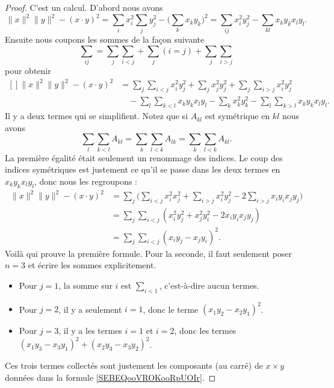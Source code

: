 \begin{proof}
    C'est un calcul. D'abord nous avons
    \begin{equation}
        \| x \|^2\| y \|^2-(x\cdot y)^2=\sum_ix_i^2\sum_jy_j^2-\big( \sum_k x_ky_k  \big)^2=\sum_{ij}x_i^2y_j^2-\sum_{kl}x_ky_kx_ly_l.
    \end{equation}
    Ensuite nous coupons les sommes de la façon suivante
    \begin{equation}
        \sum_{ij}=\sum_j\sum_{i<j}+\sum_j(i=j)+\sum_j\sum_{i>j}
    \end{equation}
    pour obtenir
    \begin{equation}
        \begin{aligned}[]
            \| x \|^2\| y \|^2-(x\cdot y)^2&=\sum_j\sum_{i<j}x_i^2y_j^2+\sum_jx_j^2y_j^2+\sum_j\sum_{i>j}x_i^2y_j^2\\
                &\quad-\sum_l\sum_{k<l}x_ky_kx_ly_l-\sum_kx_k^2y_k^2-\sum_l\sum_{k>l}x_ky_kx_ly_l.
        \end{aligned}
    \end{equation}
    Il y a deux termes qui se simplifient. Notez que si \( A_{kl}\) est symétrique en \( kl\) nous avons
    \begin{equation}
        \sum_l\sum_{k<l}A_{kl}=\sum_k\sum_{l<k}A_{lk}=\sum_k\sum_{l<k}A_{kl}.
    \end{equation}
    La première égalité était seulement un renommage des indices. Le coup des indices symétriques est justement ce qu'il se passe dans les deux termes en\( x_ky_kx_ly_l\), donc nous les regroupons :
    \begin{subequations}
        \begin{align}
            \| x \|^2\| y \|^2-(x\cdot y)^2&=\sum_j\big( \sum_{i<j}x_i^2x_j^2+\sum_{i>j}x_i^2y_j^2-2\sum_{i>j}x_iy_ix_jy_j \big)\\
            &=\sum_j\sum_{i<j}(x_i^2y_j^2+x_j^2y_i^2-2x_iy_ix_jy_j)\\
            &=\sum_j\sum_{i<j}(x_iy_j-x_jy_i)^2.
        \end{align}
    \end{subequations}
    Voilà qui prouve la première formule. Pour la seconde, il faut seulement poser \( n=3\) et écrire les sommes explicitement.

    \begin{itemize}
        \item
            Pour \( j=1\), la somme sur \( i\) est \( \sum_{i<1}\), c'est-à-dire aucun termes.
        \item
            Pour \( j=2\), il y a seulement \( i=1\), donc le terme \( (x_1y_2-x_2y_1)^2\).
        \item
            Pour \( j=3\), il y a les termes \( i=1\) et \( i=2\), donc les termes \( (x_1y_3-x_3y_1)^2+(x_2y_3-x_3y_2)^2\).
    \end{itemize}
    Ces trois termes collectés sont justement les composants (au carré) de \( x\times y\) données dans la formule \eqref{SEBEQooVROKooRpUOIr}.
\end{proof}

